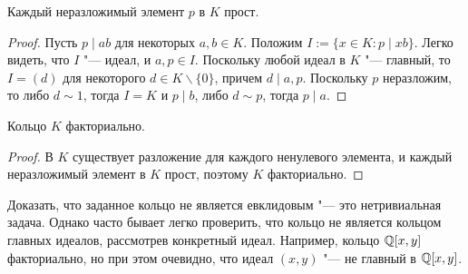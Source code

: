 \begin{proposition}
	Каждый неразложимый элемент $p$ в $K$ прост.
\end{proposition}

\begin{proof}
	Пусть $p \mid ab$ для некоторых $a, b \in K$. Положим $I := \{x \in K: p \mid xb\}$. Легко видеть, что $I$ "--- идеал, и $a, p \in I$. Поскольку любой идеал в $K$ "--- главный, то $I = (d)$ для некоторого $d \in K \backslash \{0\}$, причем $d \mid a, p$. Поскольку $p$ неразложим, то либо $d \sim 1$, тогда $I = K$ и $p \mid b$, либо $d \sim p$, тогда $p \mid a$.
\end{proof}

\begin{theorem}
	Кольцо $K$ факториально.
\end{theorem}

\begin{proof}
	В $K$ существует разложение для каждого ненулевого элемента, и каждый неразложимый элемент в $K$ прост, поэтому $K$ факториально.
\end{proof}

\begin{note}
	Доказать, что заданное кольцо не является евклидовым "--- это нетривиальная задача. Однако часто бывает легко проверить, что кольцо не является кольцом главных идеалов, рассмотрев конкретный идеал. Например, кольцо $\mathbb{Q}[x, y]$ факториально, но при этом очевидно, что идеал $(x, y)$ "--- не главный в $\mathbb{Q}[x, y]$.
\end{note}